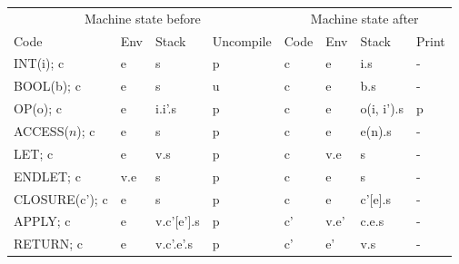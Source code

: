 \documentclass[11pt]{article}
\begin{document}
\begin{tabular}{l|l|l|l||l|l|l|l}
\multicolumn{4}{c}{Machine state before}&
\multicolumn{4}{c}{Machine state after}\\
Code & Env & Stack & Uncompile & Code & Env & Stack & Print\\
INT(i); c & e & s & p & c & e & i.s & -\\
BOOL(b); c & e & s & u & c & e & b.s & -\\
OP(o); c & e & i.i'.s & p & c & e & o(i, i').s & p\\
ACCESS($n$); c & e & s & p & c & e & e(n).s & - \\
LET; c & e & v.s & p & c & v.e & s & -\\
ENDLET; c & v.e & s & p & c & e & s & -\\
CLOSURE(c'); c & e & s & p & c & e & c'[e].s & -\\
APPLY; c & e & v.c'[e'].s & p & c' & v.e' & c.e.s & -\\
RETURN; c & e & v.c'.e'.s & p & c' & e' & v.s & -\\
\end{tabular}
\end{document}
